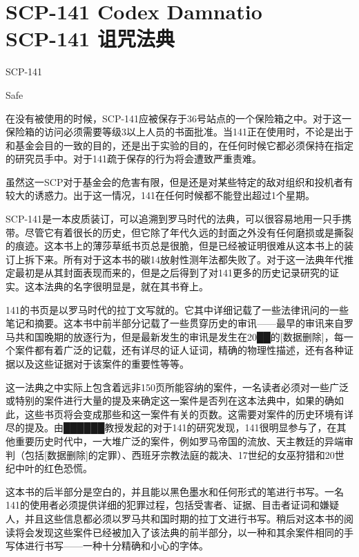 \chapter[SCP-141 诅咒法典]{
    SCP-141 Codex Damnatio\\
    SCP-141 诅咒法典
}

\label{chap:SCP-141}

SCP-141

Safe

在没有被使用的时候，SCP-141应被保存于36号站点的一个保险箱之中。对于这一保险箱的访问必须需要等级3以上人员的书面批准。当141正在使用时，不论是出于和基金会目的一致的目的，还是出于实验的目的，在任何时候它都必须保持在指定的研究员手中。对于141疏于保存的行为将会遭致严重责难。

虽然这一SCP对于基金会的危害有限，但是还是对某些特定的敌对组织和投机者有较大的诱惑力。出于这一情况，141在任何时候都不能登出超过1个星期。

SCP-141是一本皮质装订，可以追溯到罗马时代的法典，可以很容易地用一只手携带。尽管它有着很长的历史，但它除了年代久远的封面之外没有任何磨损或是撕裂的痕迹。这本书上的薄莎草纸书页总是很脆，但是已经被证明很难从这本书上的装订上拆下来。所有对于这本书的碳14放射性测年法都失败了。对于这一法典年代推定最初是从其封面表现而来的，但是之后得到了对141更多的历史记录研究的证实。这本法典的名字很明显是，就在其书脊上。

141的书页是以罗马时代的拉丁文写就的。它其中详细记载了一些法律讯问的一些笔记和摘要。这本书中前半部分记载了一些贯穿历史的审讯——最早的审讯来自罗马共和国晚期的放逐行为，但是最新发生的审讯是发生在20██的{[}数据删除]，每一个案件都有着广泛的记载，还有详尽的证人证词，精确的物理性描述，还有各种证据以及这些证据对于该案件的重要性等等。

这一法典之中实际上包含着远非150页所能容纳的案件，一名读者必须对一些广泛或特别的案件进行大量的提及来确定这一案件是否列在这本法典中，如果的确如此，这些书页将会变成那些和这一案件有关的页数。这需要对案件的历史环境有详尽的提及。由██████教授发起的对于141的研究发现，141很明显参与了，在其他重要历史时代中，一大堆广泛的案件，例如罗马帝国的流放、天主教廷的异端审判（包括{[}数据删除]的定罪）、西班牙宗教法庭的裁决、17世纪的女巫狩猎和20世纪中叶的红色恐慌。

这本书的后半部分是空白的，并且能以黑色墨水和任何形式的笔进行书写。一名141的使用者必须提供详细的犯罪过程，包括受害者、证据、目击者证词和嫌疑人，并且这些信息都必须以罗马共和国时期的拉丁文进行书写。稍后对这本书的阅读将会发现这些案件已经被加入了该法典的前半部分，以一种和其余案件相同的手写体进行书写——一种十分精确和小心的字体。

